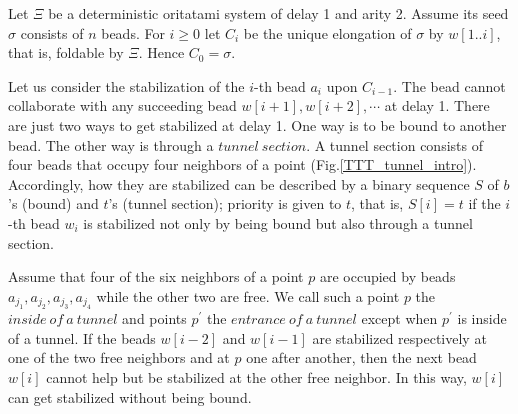 \documentclass[runningheads]{llncs}
\begin{document}


Let $\Xi$ be a deterministic oritatami system of delay 1 and arity 2. Assume its seed $\sigma$ consists of $n$ beads.
For $i \geq 0$ let $C_i$ be the unique elongation of $\sigma$ by $w[1..i]$, that is, foldable by $\Xi$. Hence $C_0 = \sigma$.


Let us consider the stabilization of the $i$-th bead $a_i$ upon $C_{i-1}$. The bead cannot collaborate with any succeeding bead $w[i+1],w[i+2],\cdots$ at delay 1. There are just two ways to get stabilized at delay 1. One way is to be bound to another bead. The other way is through a $tunnel\ section$. A tunnel section consists of four beads that occupy four neighbors of a point (Fig.\ref{TTT_tunnel_intro}). 
Accordingly, how they are stabilized can be described by a binary sequence $S$ of $b$'s (bound) and $t$'s (tunnel section); priority is given to $t$, that is, $S[i] = t$ if the $i$-th bead $w_i$ is stabilized not only by being bound but also through a tunnel section. 

Assume that four of the six neighbors of a point $p$ are occupied by beads $a_{j_1},a_{j_2},a_{j_3},a_{j_4}$ while the other two are free. We call such a point $p$ the $inside\ of\ a\ tunnel$ and points $p^\prime$ the $entrance\ of\ a\ tunnel$ except when $p^\prime$ is inside of a tunnel. If the beads $w[i-2]$ and $w[i-1]$ are stabilized respectively at one of the two free neighbors and at $p$ one after another, then the next bead $w[i]$ cannot help but be stabilized at the other free neighbor. In this way, $w[i]$ can get stabilized without being bound.

\end{document}
